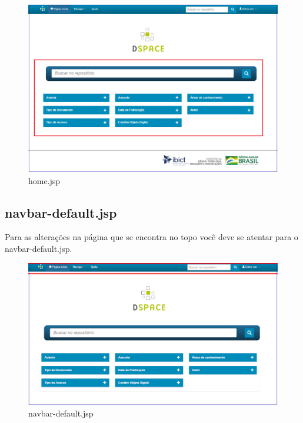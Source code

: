 \documentclass[12pt,hidelinks]{article}
\begin{document}
        \begin{figure}[!htp]
                \centering
                \includegraphics[scale=0.5]{figura/home.png}
                \caption{home.jsp}
            \label{Rotulo}
        \end{figure}

\subsection{navbar-default.jsp}
Para as alterações na página que se encontra no topo você deve se atentar para o navbar-default.jsp.

\begin{figure}[!htp]
                \centering
                \includegraphics[scale=0.5]{figura/navbar-default.png}
                \caption{navbar-default.jsp}
            \label{Rotulo}
        \end{figure}

\newpage  
\end{document}
